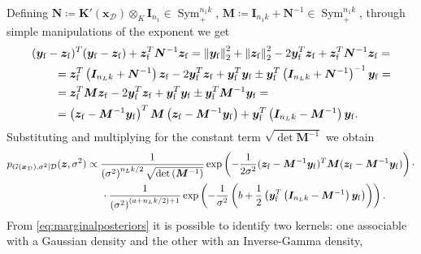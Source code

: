 Defining $\bm{N} \coloneqq \bm{K}'(\bm{x}_{\mathcal{D}}) \otimes_K \bm{I}_{n_1} \in \operatorname{Sym}_+^{n_1 k}$, $\bm{M} \coloneqq \bm{I}_{n_1 k} + \bm{N}^{-1} \in \operatorname{Sym}_+^{n_1 k}$, through simple manipulations of the exponent we get
\begin{equation*}
	\begin{aligned}
		& (\bm{y}_{\mathrm{f}} - \bm{z}_{\mathrm{f}})^T (\bm{y}_{\mathrm{f}} - \bm{z}_{\mathrm{f}}) + \bm{z}_{\mathrm{f}}^T \bm{N}^{-1} \bm{z}_{\mathrm{f}} = 
		\left\lVert\bm{y}_{\mathrm{f}}\right\rVert_2^2 + \left\lVert\bm{z}_{\mathrm{f}}\right\rVert_2^2 - 2 \bm{y}_{\mathrm{f}}^T \bm{z}_{\mathrm{f}} + \bm{z}_{\mathrm{f}}^T \bm{N}^{-1} \bm{z}_{\mathrm{f}} = \\
		& \kern20pt = \bm{z}_{\mathrm{f}}^T \left(\bm{I}_{n_L k} + \bm{N}^{-1}\right) \bm{z}_{\mathrm{f}} - 2 \bm{y}_{\mathrm{f}}^T \bm{z}_{\mathrm{f}} + \bm{y}_{\mathrm{f}}^T \bm{y}_{\mathrm{f}} \pm \bm{y}_{\mathrm{f}}^T \left(\bm{I}_{n_L k} + \bm{N}^{-1}\right)^{-1} \bm{y}_{\mathrm{f}} = \\
		& \kern20pt = \bm{z}_{\mathrm{f}}^T \bm{M} \bm{z}_{\mathrm{f}} - 2 \bm{y}_{\mathrm{f}}^T \bm{z}_{\mathrm{f}} + \bm{y}_{\mathrm{f}}^T \bm{y}_{\mathrm{f}} \pm \bm{y}_{\mathrm{f}}^T \bm{M}^{-1} \bm{y}_{\mathrm{f}} = \\
		& \kern20pt = \left(\bm{z}_{\mathrm{f}} - \bm{M}^{-1} \bm{y}_{\mathrm{f}}\right)^T \bm{M} \left(\bm{z}_{\mathrm{f}} - \bm{M}^{-1} \bm{y}_{\mathrm{f}}\right) + \bm{y}_{\mathrm{f}}^T \left(\bm{I}_{n_L k} - \bm{M}^{-1}\right) \bm{y}_{\mathrm{f}}.
	\end{aligned}
\end{equation*}
Substituting and multiplying for the constant term $\sqrt{\det{\bm{M}^{-1}}}$ we obtain
\begin{equation} \label{eq:marginalposteriors}
	\begin{aligned}
		p_{G(\bm{x}_{\mathcal{D}}), \sigma^2 | \mathcal{D}}(\bm{z}, \sigma^2) & \propto \frac{1}{\left(\sigma^2\right)^{n_L k / 2} \sqrt{\operatorname{det}\left(\bm{M}^{-1}\right)}} \operatorname{exp}\left(-\frac{1}{2 \sigma^2} (\bm{z}_{\mathrm{f}} - \bm{M}^{-1} \bm{y}_{\mathrm{f}})^T \bm{M} (\bm{z}_{\mathrm{f}} - \bm{M}^{-1} \bm{y}_{\mathrm{f}})\right) \cdot \\
		& \kern14.65pt \cdot \frac{1}{\left(\sigma^2\right)^{(a + n_L k / 2) + 1}} \operatorname{exp}\left(-\frac{1}{\sigma^2} \left(b + \frac{1}{2} \left(\bm{y}_{\mathrm{f}}^T \left(\bm{I}_{n_L k} - \bm{M}^{-1}\right) \bm{y}_{\mathrm{f}}\right)\right)\right).
	\end{aligned}
\end{equation}
From \cref{eq:marginalposteriors} it is possible to identify two kernels: one associable with a Gaussian density and the other with an Inverse-Gamma density,
